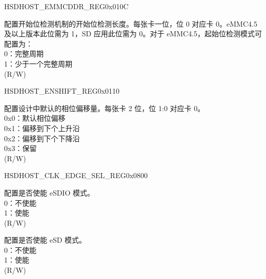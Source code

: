 \begin{register}{H}{SDHOST\_EMMCDDR\_REG}{0x010C}\label{regdesc:SDHOSTEMMCDDRREG}
%
%
\regnewline%
\begin{regdesc}\begin{reglist}
\label{fielddesc:SDHOSTHALFSTARTBITREG}\item [SDHOST\_HALFSTARTBIT\_REG] 配置开始位检测机制的开始位检测长度。每张卡一位，位 0 对应卡 0。eMMC4.5 及以上版本此位需为 1，SD 应用此位需为 0。对于 eMMC4.5，起始位检测模式可配置为：\\
0：完整周期\\
1：少于一个完整周期\\(R/W)
\end{reglist}\end{regdesc}
\end{register}


\begin{register}{H}{SDHOST\_ENSHIFT\_REG}{0x0110}\label{regdesc:SDHOSTENSHIFTREG}
%
%
\regnewline%
\begin{regdesc}\begin{reglist}
\label{fielddesc:SDHOSTENABLESHIFTREG}\item [SDHOST\_ENABLE\_SHIFT\_REG] 配置设计中默认的相位偏移量。每张卡 2 位，位 1:0 对应卡 0。\\
0x0：默认相位偏移\\
0x1：偏移到下个上升沿\\
0x2：偏移到下个下降沿\\
0x3：保留\\ (R/W)
\end{reglist}\end{regdesc}
\end{register}


\begin{register}{H}{SDHOST\_CLK\_EDGE\_SEL\_REG}{0x0800}\label{regdesc:SDHOSTCLKEDGESELREG}
%
%
%
%
\regnewline%
\begin{regdesc}\begin{reglist}
\label{fielddesc:SDHOSTESDIOMODE}\item [SDHOST\_ESDIO\_MODE] 配置是否使能 eSDIO 模式。\\
0：不使能\\
1：使能\\ (R/W)
\label{fielddesc:SDHOSTESDMODE}\item [SDHOST\_ESD\_MODE] 配置是否使能 eSD 模式。\\
0：不使能\\
1：使能\\ (R/W)
\end{reglist}\end{regdesc}
\end{register}


